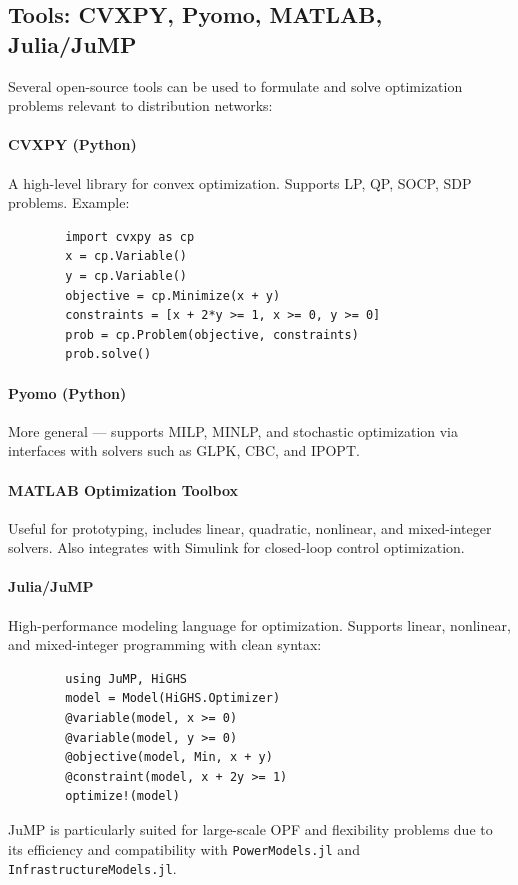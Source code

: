 \documentclass[11pt]{article}
\begin{document}
	\subsection{Tools: CVXPY, Pyomo, MATLAB, Julia/JuMP}
	
	Several open-source tools can be used to formulate and solve optimization problems relevant to distribution networks:
	
	\paragraph{CVXPY (Python)}
	A high-level library for convex optimization.  
	Supports LP, QP, SOCP, SDP problems.  
	Example:
	\begin{verbatim}
		import cvxpy as cp
		x = cp.Variable()
		y = cp.Variable()
		objective = cp.Minimize(x + y)
		constraints = [x + 2*y >= 1, x >= 0, y >= 0]
		prob = cp.Problem(objective, constraints)
		prob.solve()
	\end{verbatim}
	
	\paragraph{Pyomo (Python)}
	More general — supports MILP, MINLP, and stochastic optimization via interfaces with solvers such as GLPK, CBC, and IPOPT.
	
	\paragraph{MATLAB Optimization Toolbox}
	Useful for prototyping, includes linear, quadratic, nonlinear, and mixed-integer solvers.  
	Also integrates with Simulink for closed-loop control optimization.
	
	\paragraph{Julia/JuMP}
	High-performance modeling language for optimization.  
	Supports linear, nonlinear, and mixed-integer programming with clean syntax:
	\begin{verbatim}
		using JuMP, HiGHS
		model = Model(HiGHS.Optimizer)
		@variable(model, x >= 0)
		@variable(model, y >= 0)
		@objective(model, Min, x + y)
		@constraint(model, x + 2y >= 1)
		optimize!(model)
	\end{verbatim}
	
	JuMP is particularly suited for large-scale OPF and flexibility problems due to its efficiency and compatibility with \texttt{PowerModels.jl} and \texttt{InfrastructureModels.jl}.
	
\end{document}
